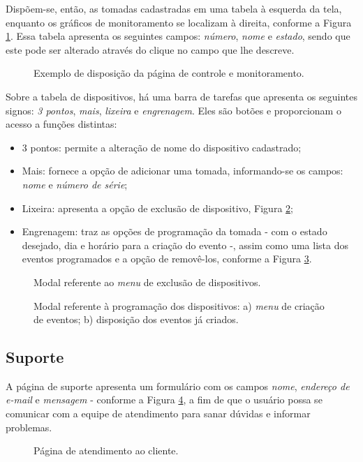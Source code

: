 \documentclass[a4paper, 12pt]{article}
\begin{document}
Dispõem-se, então, as tomadas cadastradas em uma tabela à esquerda da tela, enquanto os gráficos de monitoramento se localizam à direita, conforme a Figura \ref{fig:controle}. Essa tabela apresenta os seguintes campos: \textit{número}, \textit{nome} e \textit{estado}, sendo que este pode ser alterado através do clique no campo que lhe descreve.

\begin{figure}[!ht]
	\centering
	\caption{Exemplo de disposição da página de controle e monitoramento.}
	\label{fig:controle}
\end{figure}

Sobre a tabela de dispositivos, há uma barra de tarefas que apresenta os seguintes signos: \textit{3 pontos}, \textit{mais}, \textit{lixeira} e \textit{engrenagem}. Eles são botões e proporcionam o acesso a funções distintas:

\begin{itemize}
\item 3 pontos: permite a alteração de nome do dispositivo cadastrado;
\item Mais: fornece a opção de adicionar uma tomada, informando-se os campos: \textit{nome} e \textit{número de série};
\item Lixeira: apresenta a opção de exclusão de dispositivo, Figura \ref{fig:lixeira};
\item Engrenagem: traz as opções de programação da tomada - com o estado desejado, dia e horário para a criação do evento -, assim como uma lista dos eventos programados e a opção de removê-los, conforme a Figura \ref{fig:modalControle}.
\end{itemize}

\begin{figure}[!ht]
	\centering
	\caption{Modal referente ao \textit{menu} de exclusão de dispositivos.}
	\label{fig:lixeira}
\end{figure}

\begin{figure}[!ht]
	\centering
	\caption{Modal referente à programação dos dispositivos: a) \textit{menu} de criação de eventos; b) disposição dos eventos já criados. }
	\label{fig:modalControle}
\end{figure}

\subsection{Suporte}

A página de suporte apresenta um formulário com os campos \textit{nome}, \textit{endereço de e-mail} e \textit{mensagem} - conforme a Figura \ref{fig:suporte}, a fim de que o usuário possa se comunicar com a equipe de atendimento para sanar dúvidas e informar problemas.

\begin{figure}[!ht]
	\centering
	\caption{Página de atendimento ao cliente.}
	\label{fig:suporte}
\end{figure}
\end{document}
